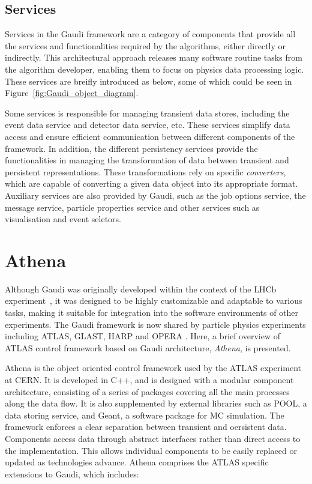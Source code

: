 \subsection{Services}
Services in the Gaudi framework are a category of components that provide all the services and functionalities required by the algorithms, either directly or indirectly. This architectural approach releases many software routine tasks from the algorithm developer, enabling them to focus on physics data processing logic. These services are breifly introduced as below, some of which could be seen in Figure~\ref{fig:Gaudi_object_diagram}.

Some services is responsible for managing transient data stores, including the event data service and detector data service, etc. These services simplify data access and ensure efficient communication between different components of the framework. In addition, the different persistency services provide the functionalities in managing the transformation of data between transient and persistent representations. These transformations rely on specific \textit{converters}, which are capable of converting a given data object into its appropriate format. Auxiliary services are also provided by Gaudi, such as the job options service, the message service, particle properties service and other services such as visualisation and event seletors.

\section{Athena}
Although Gaudi was originally developed within the context of the LHCb experiment~\cite{LHCb_tech}, it was designed to be highly customizable and adaptable to various tasks, making it suitable for integration into the software environments of other experiments. The Gaudi framework is now shared by particle physics experiments including ATLAS, GLAST, HARP and OPERA \cite{CHEP2004}. Here, a brief overview of ATLAS control framework based on Gaudi architecture, \textit{Athena}, is presented.

Athena is the object oriented control framework used by the ATLAS experiment at CERN. It is developed in C++, and is designed with a modular component architecture, consisting of a series of packages covering all the main processes along the data flow. It is also supplemented by external libraries such as POOL, a data storing service, and Geant, a software package for MC simulation.
The framework enforces a clear separation between transient and oersistent data. Components access data through abstract interfaces rather than direct access to the implementation. This allows individual components to be easily replaced or updated as technologies advance. Athena comprises the ATLAS specific extensions to Gaudi, which includes:

